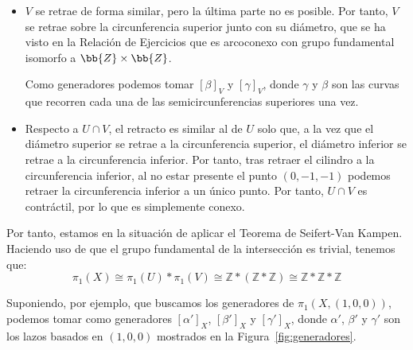 \documentclass[12pt]{article}
\begin{document}
\begin{ejercicio}
\begin{itemize}
            Por lo tanto, como $U$ se retrae sobre un conjunto homeomorfo a $\bb{S}^1$, tenemos que $\pi_1(U)\cong \mathbb{Z}$ y que es arcoconexo.
            
            Un generador del grupo fundamental es $[\alpha]_U$, con $\alpha$ la curva que recorre la semicircunferencia inferior una vez.

            \item $V$ se retrae de forma similar, pero la última parte no es posible. Por tanto, $V$ se retrae sobre la circunferencia superior junto con su diámetro, que se ha visto en la Relación de Ejercicios que es arcoconexo con grupo fundamental isomorfo a $\bb{Z}\times \bb{Z}$.
            
            Como generadores podemos tomar $[\beta]_V$ y $[\gamma]_V$, donde $\gamma$ y $\beta$ son las curvas que recorren cada una de las semicircunferencias superiores una vez.
            \item Respecto a $U\cap V$, el retracto es similar al de $U$ solo que, a la vez que el diámetro superior se retrae a la circunferencia superior, el diámetro inferior se retrae a la circunferencia inferior. Por tanto, tras retraer el cilindro a la circunferencia inferior, al no estar presente el punto $(0,-1,-1)$ podemos retraer la circunferencia inferior a un único punto. Por tanto, $U\cap V$ es contráctil, por lo que es simplemente conexo.
        \end{itemize}

        Por tanto, estamos en la situación de aplicar el Teorema de Seifert-Van Kampen. Haciendo uso de que el grupo fundamental de la intersección es trivial, tenemos que:
        \begin{equation*}
            \pi_1(X) \cong \pi_1(U)\ast \pi_1(V) \cong \mathbb{Z}\ast (\mathbb{Z}\ast \mathbb{Z}) \cong \mathbb{Z}\ast\mathbb{Z}\ast \mathbb{Z}
        \end{equation*}

        Suponiendo, por ejemplo, que buscamos los generadores de $\pi_1(X, (1,0,0))$, podemos tomar como generadores $[\alpha']_X$, $[\beta']_X$ y $[\gamma']_X$, donde $\alpha'$, $\beta'$ y $\gamma'$ son los lazos basados en $(1,0,0)$ mostrados en la Figura~\ref{fig:generadores}.
        \begin{figure}[h]
            \centering
\end{figure}
\end{ejercicio}
\end{document}
